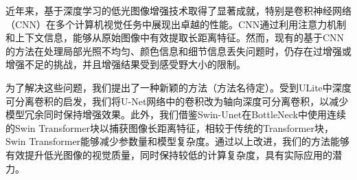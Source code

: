 \documentclass[a4paper, 10pt]{article}
\begin{document}
		
		近年来，基于深度学习的低光图像增强技术取得了显著成就，特别是卷积神经网络（CNN）在多个计算机视觉任务中展现出卓越的性能。CNN通过利用注意力机制\cite{yang2021locally,zhang2020attention}和上下文信息，能够从原始图像中有效提取长距离特征\cite{li2018multi, zamir2020learning}。然而，现有的基于CNN的方法在处理局部光照不均匀、颜色信息和细节信息丢失问题时，仍存在过增强或增强不足的挑战，并且增强结果受到感受野大小的限制。
		
		
		为了解决这些问题，我们提出了一种新颖的方法（方法名待定）。受到ULite\cite{dinh20231m}中深度可分离卷积的启发，我们将U-Net网络中的卷积改为轴向深度可分离卷积，以减少模型冗余同时保持增强效果。此外，我们借鉴Swin-Unet\cite{cao2022swin}在BottleNeck中使用连续的Swin Transformer块以捕获图像长距离特征，相较于传统的Transformer块，Swin Transformer能够减少参数量和模型复杂度。通过以上改进，我们的方法能够有效提升低光图像的视觉质量，同时保持较低的计算复杂度，具有实际应用的潜力。
		
\end{document}

